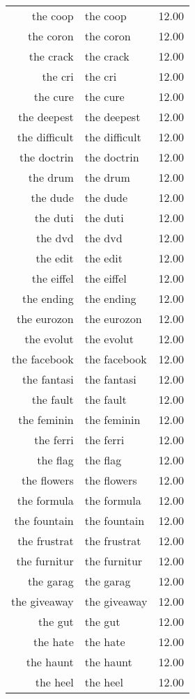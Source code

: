 \begin{table}[ht]
\begin{tabular}{rlr}
  the coop & the coop & 12.00 \\ 
  the coron & the coron & 12.00 \\ 
  the crack & the crack & 12.00 \\ 
  the cri & the cri & 12.00 \\ 
  the cure & the cure & 12.00 \\ 
  the deepest & the deepest & 12.00 \\ 
  the difficult & the difficult & 12.00 \\ 
  the doctrin & the doctrin & 12.00 \\ 
  the drum & the drum & 12.00 \\ 
  the dude & the dude & 12.00 \\ 
  the duti & the duti & 12.00 \\ 
  the dvd & the dvd & 12.00 \\ 
  the edit & the edit & 12.00 \\ 
  the eiffel & the eiffel & 12.00 \\ 
  the ending & the ending & 12.00 \\ 
  the eurozon & the eurozon & 12.00 \\ 
  the evolut & the evolut & 12.00 \\ 
  the facebook & the facebook & 12.00 \\ 
  the fantasi & the fantasi & 12.00 \\ 
  the fault & the fault & 12.00 \\ 
  the feminin & the feminin & 12.00 \\ 
  the ferri & the ferri & 12.00 \\ 
  the flag & the flag & 12.00 \\ 
  the flowers & the flowers & 12.00 \\ 
  the formula & the formula & 12.00 \\ 
  the fountain & the fountain & 12.00 \\ 
  the frustrat & the frustrat & 12.00 \\ 
  the furnitur & the furnitur & 12.00 \\ 
  the garag & the garag & 12.00 \\ 
  the giveaway & the giveaway & 12.00 \\ 
  the gut & the gut & 12.00 \\ 
  the hate & the hate & 12.00 \\ 
  the haunt & the haunt & 12.00 \\ 
  the heel & the heel & 12.00 \\ 

\end{tabular}
\end{table}
